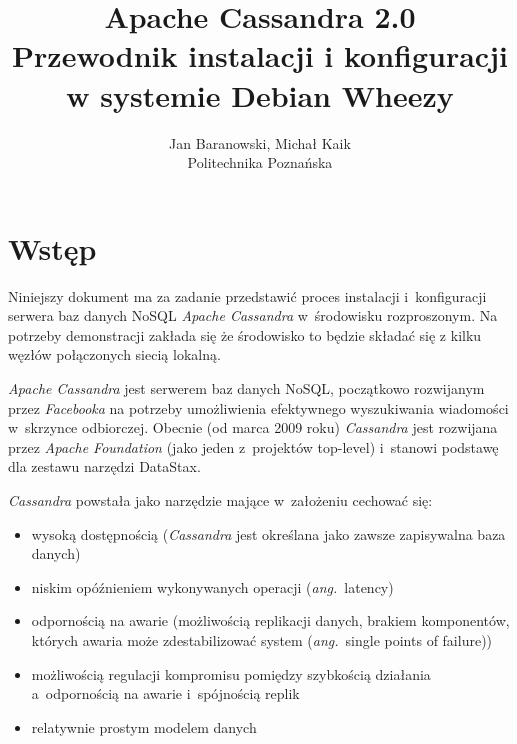 \documentclass{article} %
\begin{document}

\title{Apache Cassandra 2.0\\\vspace{2ex}Przewodnik instalacji i konfiguracji w systemie Debian Wheezy\\\vspace{3ex}}
\author{Jan Baranowski, Michał Kaik\\Politechnika Poznańska}

\maketitle

\section{Wstęp}\label{sec:intro}

Niniejszy dokument ma za zadanie przedstawić proces instalacji i~konfiguracji serwera baz danych NoSQL \emph{Apache Cassandra} w~środowisku rozproszonym.
Na potrzeby demonstracji zakłada się że środowisko to będzie składać się z kilku węzłów połączonych siecią lokalną.

\emph{Apache Cassandra} jest serwerem baz danych NoSQL, początkowo rozwijanym przez \emph{Facebooka} na potrzeby umożliwienia efektywnego wyszukiwania wiadomości w~skrzynce odbiorczej.
Obecnie (od marca 2009 roku) \emph{Cassandra} jest rozwijana przez \emph{Apache Foundation} (jako jeden z~projektów top-level) i~stanowi podstawę dla zestawu narzędzi DataStax. 

\emph{Cassandra} powstała jako narzędzie mające w~założeniu cechować się:
\begin{itemize}
\item wysoką dostępnością (\emph{Cassandra} jest określana jako zawsze zapisywalna baza danych)
\item niskim opóźnieniem wykonywanych operacji (\textit{ang.}~latency)
\item odpornością na awarie (możliwością replikacji danych, brakiem komponentów, których awaria może zdestabilizować system (\textit{ang.}~single points of failure))
\item możliwością regulacji kompromisu pomiędzy szybkością działania a~odpornością na awarie i~spójnością replik
\item relatywnie prostym modelem danych
\end{itemize}
\end{document}
